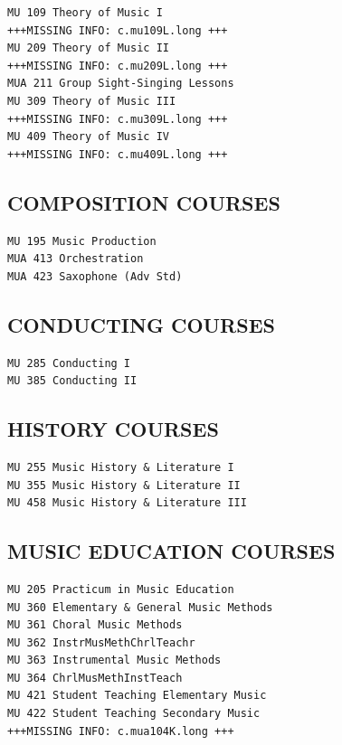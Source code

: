 \documentclass[
  letterpaper,
]{scrbook}
\begin{document}
\begin{verbatim}
MU 109 Theory of Music I
+++MISSING INFO: c.mu109L.long +++
MU 209 Theory of Music II
+++MISSING INFO: c.mu209L.long +++
MUA 211 Group Sight-Singing Lessons
MU 309 Theory of Music III
+++MISSING INFO: c.mu309L.long +++
MU 409 Theory of Music IV
+++MISSING INFO: c.mu409L.long +++
\end{verbatim}

\hypertarget{composition-courses}{%
\subsection{COMPOSITION COURSES}\label{composition-courses}}

\begin{verbatim}
MU 195 Music Production
MUA 413 Orchestration
MUA 423 Saxophone (Adv Std)
\end{verbatim}

\hypertarget{conducting-courses}{%
\subsection{CONDUCTING COURSES}\label{conducting-courses}}

\begin{verbatim}
MU 285 Conducting I
MU 385 Conducting II
\end{verbatim}

\hypertarget{history-courses}{%
\subsection{HISTORY COURSES}\label{history-courses}}

\begin{verbatim}
MU 255 Music History & Literature I
MU 355 Music History & Literature II
MU 458 Music History & Literature III
\end{verbatim}

\hypertarget{music-education-courses}{%
\subsection{MUSIC EDUCATION COURSES}\label{music-education-courses}}

\begin{verbatim}
MU 205 Practicum in Music Education
MU 360 Elementary & General Music Methods
MU 361 Choral Music Methods
MU 362 InstrMusMethChrlTeachr
MU 363 Instrumental Music Methods
MU 364 ChrlMusMethInstTeach
MU 421 Student Teaching Elementary Music
MU 422 Student Teaching Secondary Music
+++MISSING INFO: c.mua104K.long +++
\end{verbatim}
\end{document}

